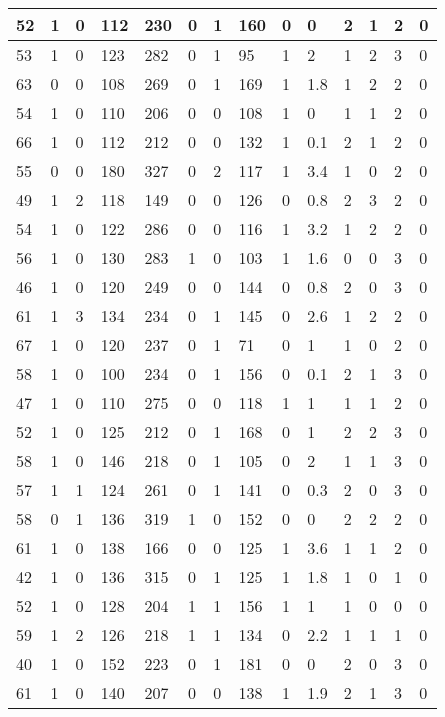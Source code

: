 \documentclass{article}
\begin{document}
\begin{table}[h!]
\begin{tabular}{|l|l|l|l|l|l|l|l|l|l|l|l|l|l|}
52 & 1 & 0 & 112 & 230 & 0 & 1 & 160 & 0 & 0 & 2  &1 & 2 & 0 \\ \hline
53 & 1 & 0 & 123 & 282 & 0 & 1 & 95 & 1 & 2 & 1  &2 & 3 & 0 \\ \hline
63 & 0 & 0 & 108 & 269 & 0 & 1 & 169 & 1 & 1.8 & 1  &2 & 2 & 0 \\ \hline
54 & 1 & 0 & 110 & 206 & 0 & 0 & 108 & 1 & 0 & 1  &1 & 2 & 0 \\ \hline
66 & 1 & 0 & 112 & 212 & 0 & 0 & 132 & 1 & 0.1 & 2  &1 & 2 & 0 \\ \hline
55 & 0 & 0 & 180 & 327 & 0 & 2 & 117 & 1 & 3.4 & 1  &0 & 2 & 0 \\ \hline
49 & 1 & 2 & 118 & 149 & 0 & 0 & 126 & 0 & 0.8 & 2  &3 & 2 & 0 \\ \hline
54 & 1 & 0 & 122 & 286 & 0 & 0 & 116 & 1 & 3.2 & 1  &2 & 2 & 0 \\ \hline
56 & 1 & 0 & 130 & 283 & 1 & 0 & 103 & 1 & 1.6 & 0  &0 & 3 & 0 \\ \hline
46 & 1 & 0 & 120 & 249 & 0 & 0 & 144 & 0 & 0.8 & 2  &0 & 3 & 0 \\ \hline
61 & 1 & 3 & 134 & 234 & 0 & 1 & 145 & 0 & 2.6 & 1  &2 & 2 & 0 \\ \hline
67 & 1 & 0 & 120 & 237 & 0 & 1 & 71 & 0 & 1 & 1  &0 & 2 & 0 \\ \hline
58 & 1 & 0 & 100 & 234 & 0 & 1 & 156 & 0 & 0.1 & 2  &1 & 3 & 0 \\ \hline
47 & 1 & 0 & 110 & 275 & 0 & 0 & 118 & 1 & 1 & 1  &1 & 2 & 0 \\ \hline
52 & 1 & 0 & 125 & 212 & 0 & 1 & 168 & 0 & 1 & 2  &2 & 3 & 0 \\ \hline
58 & 1 & 0 & 146 & 218 & 0 & 1 & 105 & 0 & 2 & 1  &1 & 3 & 0 \\ \hline
57 & 1 & 1 & 124 & 261 & 0 & 1 & 141 & 0 & 0.3 & 2  &0 & 3 & 0 \\ \hline
58 & 0 & 1 & 136 & 319 & 1 & 0 & 152 & 0 & 0 & 2  &2 & 2 & 0 \\ \hline
61 & 1 & 0 & 138 & 166 & 0 & 0 & 125 & 1 & 3.6 & 1  &1 & 2 & 0 \\ \hline
42 & 1 & 0 & 136 & 315 & 0 & 1 & 125 & 1 & 1.8 & 1  &0 & 1 & 0 \\ \hline
52 & 1 & 0 & 128 & 204 & 1 & 1 & 156 & 1 & 1 & 1  &0 & 0 & 0 \\ \hline
59 & 1 & 2 & 126 & 218 & 1 & 1 & 134 & 0 & 2.2 & 1  &1 & 1 & 0 \\ \hline
40 & 1 & 0 & 152 & 223 & 0 & 1 & 181 & 0 & 0 & 2  &0 & 3 & 0 \\ \hline
61 & 1 & 0 & 140 & 207 & 0 & 0 & 138 & 1 & 1.9 & 2  &1 & 3 & 0 \\ \hline

\end{tabular}
\end{table}
\end{document}
